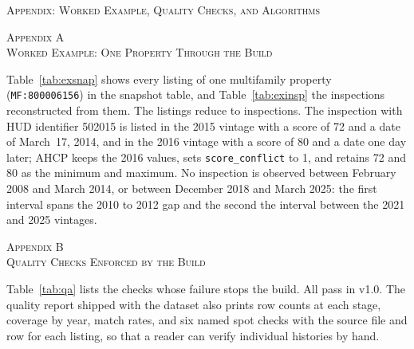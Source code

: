 \documentclass[10pt,twocolumn,letterpaper]{article}
\newcommand{\col}[1]{\texttt{\small #1}}
\newcommand{\appsection}[2]{\par\vspace{2.2ex}\begin{center}\textsc{Appendix #1}\\\textsc{#2}\end{center}\vspace{0.6ex}}
\begin{document}
\clearpage
\onecolumn
\begin{center}\textsc{Appendix: Worked Example, Quality Checks, and Algorithms}\end{center}

\appsection{A}{Worked Example: One Property Through the Build}
Table~\ref{tab:exsnap} shows every listing of one multifamily property (\col{MF:800006156}) in the snapshot table, and Table~\ref{tab:exinsp} the inspections reconstructed from them. The \exSnapRows{} listings reduce to \exInspRows{} inspections. The inspection with HUD identifier 502015 is listed in the 2015 vintage with a score of 72 and a date of March~17, 2014, and in the 2016 vintage with a score of 80 and a date one day later; AHCP keeps the 2016 values, sets \col{score\_conflict} to 1, and retains 72 and 80 as the minimum and maximum. No inspection is observed between February 2008 and March 2014, or between December 2018 and March 2025: the first interval spans the 2010 to 2012 gap and the second the interval between the 2021 and 2025 vintages.

\begin{table}[h]
\caption{Snapshot listings for property MF:800006156}\label{tab:exsnap}
\centering\footnotesize

\end{table}
\begin{table}[h]
\caption{Reconstructed inspections for property MF:800006156}\label{tab:exinsp}
\centering\footnotesize

\end{table}

\appsection{B}{Quality Checks Enforced by the Build}
Table~\ref{tab:qa} lists the checks whose failure stops the build. All pass in v1.0. The quality report shipped with the dataset also prints row counts at each stage, coverage by year, match rates, and six named spot checks with the source file and row for each listing, so that a reader can verify individual histories by hand.
\end{document}

